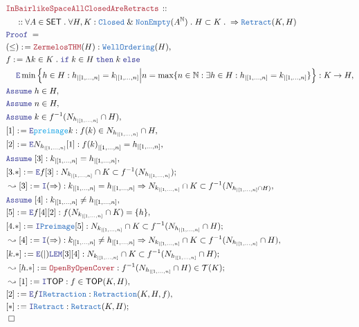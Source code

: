 \documentclass[12pt]{scrartcl}
\newcommand{\TYPE}[1]{\textcolor{NavyBlue}{\mathtt{#1}}}
\newcommand{\FUNC}[1]{\textcolor{Cerulean}{\mathtt{#1}}}
\newcommand{\LOGIC}[1]{\textcolor{Blue}{\mathtt{#1}}}
\newcommand{\THM}[1]{\textcolor{Maroon}{\mathtt{#1}}}
\renewcommand{\.}{\; . \;}
\newcommand{\de}{: \kern 0.1pc =}
\newcommand{\If}{\LOGIC{if} \;}
\newcommand{\Then}{ \; \LOGIC{then} \;}
\newcommand{\Else}{\; \LOGIC{else} \;}
\newcommand{\Theorem}[2]{& \THM{#1} \, :: \, #2 \\ & \Proof = \\ }
\newcommand{\NewLine}{\\ & \kern 1pc}
\newcommand{\Page}[1]{ \begin{align*} #1 \end{align*}   }
\renewcommand{\And}{\; \& \;}
\newcommand{\Imply}{\Rightarrow}
\newcommand{\Intro}{\LOGIC{I}}
\newcommand{\Elim}{\LOGIC{E}}
\newcommand{\Nat}{\mathbb{N} }
\newcommand{\Say}[3]{& #1 \de #2 : #3, \\}
\newcommand{\Conclude}[3]{& #1 \de #2 : #3; \\}
\newcommand{\Derive}[3]{& \leadsto #1 \de #2 : #3, \\}
\newcommand{\DeriveConclude}[3]{& \leadsto #1 \de #2 : #3 ; \\}
\newcommand{\Assume}[2]{& \LOGIC{Assume} \; #1 : #2, \\}
\newcommand{\AssumeIn}[2]{& \LOGIC{Assume} \; #1 \in #2, \\}
\newcommand{\QED}{\; \square}
\newcommand{\EndProof}{& \QED \\}
\newcommand{\Proof}{\LOGIC{Proof} \; }
\newcommand{\SET}{\mathsf{SET}}
\newcommand{\TOP}{\mathsf{TOP}}
\newcommand{\T}{\mathcal{T}}
\newcommand{\inits}[2]{{#1}_{|\left[1,\ldots,#2\right]}}
\begin{document}
\Page{
	\Theorem{InBairlikeSpaceAllClosedAreRetracts}
	{
		\NewLine ::
		\forall A \in \SET \. 
		\forall H,K : \TYPE{Closed} \And \TYPE{NonEmpty}(A^\Nat) \.
		H \subset K \. 
		\Imply \TYPE{Retract}(K,H)
	}
	\Say{(\le)}{\THM{ZermelosTHM}(H)}{ \TYPE{WellOrdering}(H)   }
	\Say{f}{
		\Lambda k \in K \. 
		\If k \in H 
		\Then k 
		\Else \NewLine 
		\Elim \min\Big\{ 
			h \in H : 
			\inits{h}{n} = \inits{k}{n} \Big|
			n = \max\{ 
				n \in \Nat : 
				\exists h \in H : 
				\inits{h}{n} = \inits{k}{n} 
				\}      
		\Big\}
	}{K \to H}
	\AssumeIn{h}{H}
	\AssumeIn{n}{H}
	\AssumeIn{k}{f^{-1}(N_{\inits{h}{n}}\cap H)}
	\Say{[1]}{\Elim \FUNC{preimage}{k}}{f(k) \in N_{\inits{h}{n}} \cap H}
	\Say{[2]}{\Elim N_{\inits{h}{n}}[1]}{\inits{f(k)}{n} = \inits{h}{n}}
	\Assume{[3]}{\inits{k}{n} = \inits{h}{n}}
	\Conclude{[3.*]}{\Elim f [3]}{N_{\inits{k}{n}} \cap K \subset f^{-1}(N_{\inits{h}{n}})}
	\Derive{[3]}{\Intro(\Imply)}   
	{
		\inits{k}{n} = \inits{h}{n} \Imply N_{\inits{k}{n}} \cap K \subset f^{-1}(N_{\inits{h}{n} \cap H)}
	}
	\Assume{[4]}{\inits{k}{n} \neq \inits{h}{n}}
	\Say{[5]}{\Elim f [4][2]}{f (N_{\inits{k}{n}} \cap K ) = \{h\}}
	\Conclude{[4.*]}{\Intro \TYPE{Preimage}[5]}
	{
		N_{\inits{k}{n}} \cap K  \subset f^{-1}(N_{\inits{h}{n}}\cap H)
	}
	\Derive{[4]}{\Intro(\Imply)}   
	{
		\inits{k}{n} \neq \inits{h}{n} \Imply N_{\inits{k}{n}} \cap K \subset f^{-1}(N_{\inits{h}{n}} \cap H)
	}
	\Conclude{[k.*]}{\Elim(|)\LOGIC{LEM}[3][4]}
	{
		N_{\inits{k}{n}} \cap K \subset f^{-1}(N_{\inits{h}{n}} \cap H)
	}
	\DeriveConclude{[h.*]}{\THM{OpenByOpenCover}}{f^{-1}(N_{\inits{h}{n}}\cap H) \in \T(K)}
	\Derive{[1]}{\Intro \TOP}{f \in \TOP(K,H)}
	\Say{[2]}{\Elim f \Intro \TYPE{Retraction}}{\TYPE{Retraction}(K,H,f)}
	\Conclude{[*]}{\Intro \TYPE{Retract}}{\TYPE{Retract}(K,H)}
	\EndProof
}
\newpage
\end{document}
